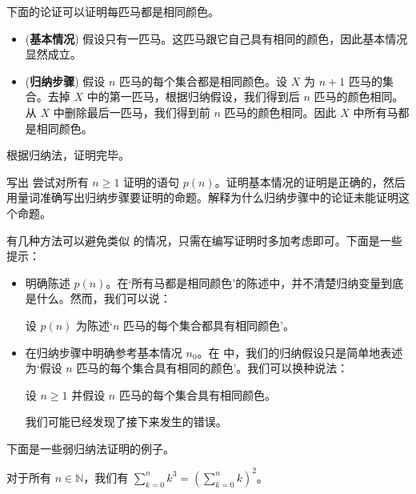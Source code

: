\begin{example}
\label{exHorseInductionFail}
下面的论证可以证明每匹马都是相同颜色。
\begin{itemize}
\item (\textbf{基本情况}) 假设只有一匹马。这匹马跟它自己具有相同的颜色，因此基本情况显然成立。
\item (\textbf{归纳步骤}) 假设 $n$ 匹马的每个集合都是相同颜色。设 $X$ 为 $n+1$ 匹马的集合。去掉 $X$ 中的第一匹马，根据归纳假设，我们得到后 $n$ 匹马的颜色相同。从 $X$ 中删除最后一匹马，我们得到前 $n$ 匹马的颜色相同。因此 $X$ 中所有马都是相同颜色。
\end{itemize}
根据归纳法，证明完毕。
\end{example}

\begin{exercise}
写出  尝试对所有 $n \ge 1$ 证明的语句 $p(n)$。证明基本情况的证明是正确的，然后用量词准确写出归纳步骤要证明的命题。解释为什么归纳步骤中的论证未能证明这个命题。
\end{exercise}

有几种方法可以避免类似  的情况，只需在编写证明时多加考虑即可。下面是一些提示：

\begin{itemize}
\item 明确陈述 $p(n)$。在`所有马都是相同颜色'的陈述中，并不清楚归纳变量到底是什么。然而，我们可以说：
\begin{center}
设 $p(n)$ 为陈述`$n$ 匹马的每个集合都具有相同颜色'。
\end{center}

\item 在归纳步骤中明确参考基本情况 $n_0$。在  中，我们的归纳假设只是简单地表述为`假设 $n$ 匹马的每个集合具有相同的颜色'。我们可以换种说法：
\begin{center}
设 $n \ge 1$ 并假设 $n$ 匹马的每个集合具有相同颜色。
\end{center}
我们可能已经发现了接下来发生的错误。
\end{itemize}

下面是一些弱归纳法证明的例子。

\begin{proposition}
对于所有 $n \in \mathbb{N}$，我们有 $\displaystyle \sum_{k=0}^n k^3 = \left( \sum_{k=0}^n k \right)^2$。
\end{proposition}

